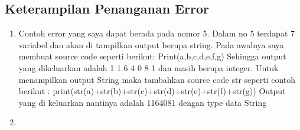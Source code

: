 \subsection{Keterampilan Penanganan Error}
\begin{enumerate}
	\item Contoh error yang saya dapat berada pada nomor 5. Dalam no 5 terdapat 7 variabel dan akan di tampilkan output berupa string. Pada awalnya saya membuat source code seperti berikut:
Print(a,b,c,d,e,f,g)
Sehingga output yang dikeluarkan adalah 1 1 6 4 0 8 1 dan masih berupa integer. Untuk menampilkan output String maka tambahkan source code str seperti contoh berikut :
print(str(a)+str(b)+str(c)+str(d)+str(e)+str(f)+str(g))
Output yang di keluarkan nantinya adalah 1164081 dengan type data String
\par
	\item 
\end{enumerate}